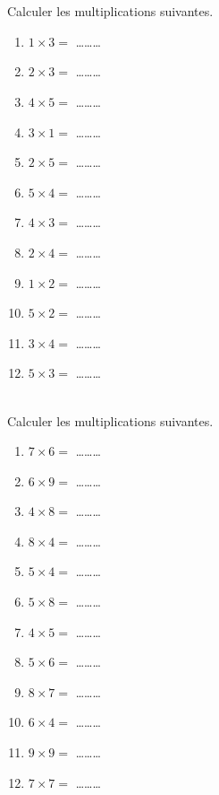 





\phantom{0}\\
\exercice \diff[1] \\
Calculer les multiplications suivantes.
\begin{multicols}{4}
\begin{enumerate}
\item $1 \times 3 =$ \ldots\ldots\ldots
\item $2 \times 3 =$ \ldots\ldots\ldots
\item $4 \times 5 =$ \ldots\ldots\ldots
\item $3 \times 1 =$ \ldots\ldots\ldots
\item $2 \times 5 =$ \ldots\ldots\ldots
\item $5 \times 4 =$ \ldots\ldots\ldots
\item $4 \times 3 =$ \ldots\ldots\ldots
\item $2 \times 4 =$ \ldots\ldots\ldots
\item $1 \times 2 =$ \ldots\ldots\ldots
\item $5 \times 2 =$ \ldots\ldots\ldots
\item $3 \times 4 =$ \ldots\ldots\ldots
\item $5 \times 3 =$ \ldots\ldots\ldots
\end{enumerate}
\end{multicols}

\exercice \diff[2] \\
Calculer les multiplications suivantes.
\begin{multicols}{4}
\begin{enumerate}
\item $7 \times 6 =$ \ldots\ldots\ldots
\item $6 \times 9 =$ \ldots\ldots\ldots
\item $4 \times 8 =$ \ldots\ldots\ldots
\item $8 \times 4 =$ \ldots\ldots\ldots
\item $5 \times 4 =$ \ldots\ldots\ldots
\item $5 \times 8 =$ \ldots\ldots\ldots
\item $4 \times 5 =$ \ldots\ldots\ldots
\item $5 \times 6 =$ \ldots\ldots\ldots
\item $8 \times 7 =$ \ldots\ldots\ldots
\item $6 \times 4 =$ \ldots\ldots\ldots
\item $9 \times 9 =$ \ldots\ldots\ldots
\item $7 \times 7 =$ \ldots\ldots\ldots
\end{enumerate}
\end{multicols}

